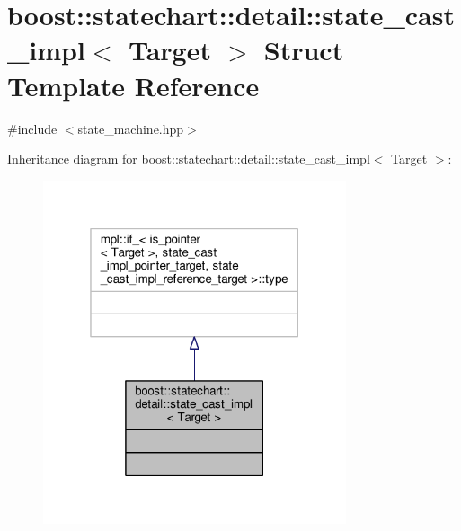 \hypertarget{structboost_1_1statechart_1_1detail_1_1state__cast__impl}{}\section{boost\+:\+:statechart\+:\+:detail\+:\+:state\+\_\+cast\+\_\+impl$<$ Target $>$ Struct Template Reference}
\label{structboost_1_1statechart_1_1detail_1_1state__cast__impl}


{\ttfamily \#include $<$state\+\_\+machine.\+hpp$>$}



Inheritance diagram for boost\+:\+:statechart\+:\+:detail\+:\+:state\+\_\+cast\+\_\+impl$<$ Target $>$\+:
\nopagebreak
\begin{figure}[H]
\begin{center}
\leavevmode
\includegraphics[width=253pt]{structboost_1_1statechart_1_1detail_1_1state__cast__impl__inherit__graph}
\end{center}
\end{figure}



